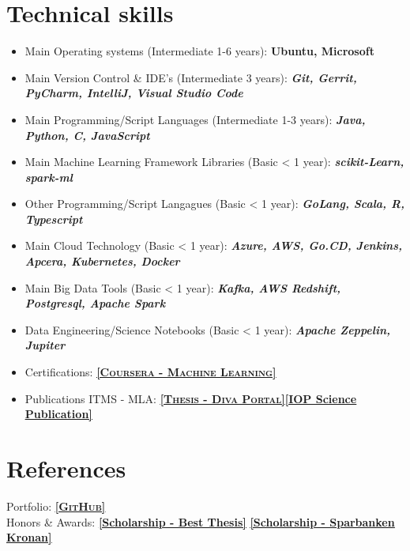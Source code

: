 \documentclass[11pt,a4paper,sans,colorlinks,linkcolor=blue,urlcolor=blue]{moderncv}
\begin{document}
\section{Technical skills}
\begin{itemize}
    \item Main Operating systems (Intermediate 1-6 years): \textbf{Ubuntu, Microsoft}
    \item Main Version Control \& IDE's (Intermediate 3 years): \textbf{\textit{Git, Gerrit, PyCharm, IntelliJ, Visual Studio Code}}
    \item Main Programming/Script Languages (Intermediate 1-3 years): \textbf{\textit{Java, Python, C, JavaScript}}
    \item Main Machine Learning Framework Libraries (Basic < 1 year): \textbf{\textit{scikit-Learn, spark-ml}}
    \item Other Programming/Script Langagues (Basic < 1 year): \textbf{\textit{GoLang, Scala, R, Typescript}}
    \item Main Cloud Technology (Basic < 1 year): \textbf{\textit{Azure, AWS, Go.CD, Jenkins, Apcera, Kubernetes, Docker}}
    \item Main Big Data Tools (Basic < 1 year): \textbf{\textit{Kafka, AWS Redshift, Postgresql, Apache Spark}}
    \item Data Engineering/Science Notebooks (Basic < 1 year): \textbf{\textit{Apache Zeppelin, Jupiter}}
    \item Certifications: \href{https://www.coursera.org/account/accomplishments/certificate/W5HM63ABYCDV}{\textbf{\textsc{\underline{[Coursera - Machine Learning]}}}}
    \item Publications ITMS - MLA\footnotemark[2]: \href{http://hh.diva-portal.org/smash/record.jsf?pid=diva2%3A1113511&dswid=4291#sthash.wwKv4JYI.dpbs}{\textbf{\textsc{\underline{[Thesis - Diva Portal]}}}}\href{http://iopscience.iop.org/article/10.1088/1757-899X/252/1/012018/pdf;jsessionid=EF9A9E415EC41D639019919DC566B21F.c4.iopscience.cld.iop.org}{\textbf{\underline{[IOP Science Publication]}}}
\end{itemize}
\section{References}
Portfolio: \underline{\href{https://github.com/Thelin90}{\textbf{\textsc{[GitHub]}}}}\\
Honors \& Awards: \href{https://www.hms-networks.com/work/in/sweden/hms-scholarship}{\textbf{\underline{[Scholarship - Best Thesis]}}} \href{http://www.hh.se/omhogskolan/aktuellt/nyheter/nyheter/studenterbelonasavsparbanksstiftelsenkronan.65446700.html}{\textbf{\underline{[Scholarship - Sparbanken Kronan]}}}

     
     
\vfill
\enlargethispage{\footskip}
\end{document}
